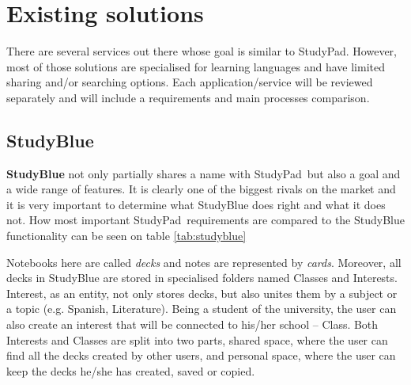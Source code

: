 \documentclass[thesis=B,english]{FITthesis}[2012/10/20]
\newcommand{\appname}{StudyPad}
\begin{document}
\newpage

\section{Existing solutions}

There are several services out there whose goal is similar to \appname. However, most of those solutions are specialised for learning languages and have limited sharing and/or searching options. Each application/service will be reviewed separately and will include a requirements and main processes comparison.

\subsection{StudyBlue}

\textbf{StudyBlue} not only partially shares a name with \appname\ but also a goal and a wide range of features. It is clearly one of the biggest rivals on the market and it is very important to determine what StudyBlue does right and what it does not. How most important \appname\ requirements are compared to the StudyBlue functionality can be seen on table \ref{tab:studyblue}

Notebooks here are called \textit{decks} and notes are represented by \textit{cards}. Moreover, all decks in StudyBlue are stored in specialised folders named Classes and Interests. Interest, as an entity, not only stores decks, but also unites them by a subject or a topic (e.g. Spanish, Literature). Being a student of the university, the user can also create an interest that will be connected to his/her school -- Class. Both Interests and Classes are split into two parts, shared space, where the user can find all the decks created by other users, and personal space, where the user can keep the decks he/she has created, saved or copied.
\end{document}

